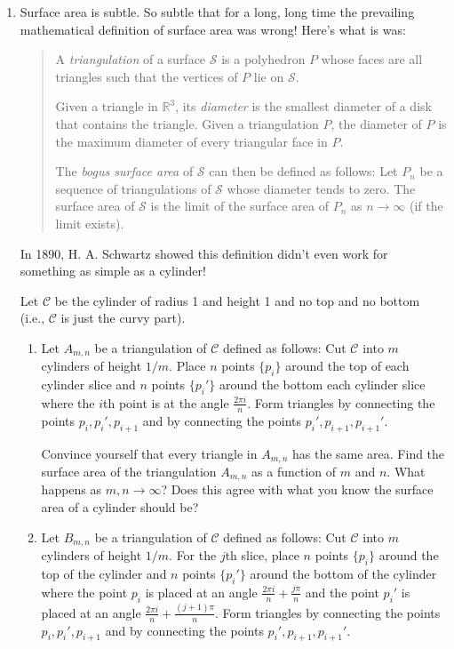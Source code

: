 \documentclass[letter]{article}
\newcommand{\R}{\mathbb{R}}
\begin{document}
\begin{enumerate}
		\item Surface area is subtle.  So subtle that for a long, long time the prevailing
			mathematical definition of surface area was wrong!  Here's what is was:
			\begin{quote}
				A \emph{triangulation} of a surface $\mathcal S$ is a polyhedron
				$P$ whose faces are all triangles such that the vertices of $P$ lie on
				$\mathcal S$.

				Given a triangle in $\R^3$, its \emph{diameter} is the smallest
				diameter of a disk that contains the triangle.  Given a triangulation
				$P$, the diameter of $P$ is the maximum diameter of every triangular face in $P$.

				The \emph{bogus surface area} of $\mathcal S$ can then be defined
				as follows:  Let $P_n$ be a sequence of triangulations of $\mathcal S$
				whose diameter tends to zero.  The surface area of $\mathcal S$
				is the limit of the surface area of $P_n$ as $n\to\infty$ (if the limit
				exists).
			\end{quote}

			In 1890, H. A. Schwartz showed this definition didn't even work for something as
			simple as a cylinder!

			Let $\mathcal C$ be the cylinder of radius 1 and height 1 and no top and no bottom 
			(i.e., $\mathcal C$ is just the curvy part).

			\begin{enumerate}
				\item Let $A_{m,n}$ be a triangulation of $\mathcal C$ defined as follows:
					Cut $\mathcal C$ into $m$ cylinders of height $1/m$.  Place
					$n$ points $\{p_i\}$ around the top of each cylinder slice
					and $n$ points $\{p_i'\}$ around the bottom each cylinder slice
					where the $i$th point is at the angle $\frac{2\pi i}{n}$.
					Form triangles by connecting the points $p_i, p_i', p_{i+1}$ and
					by connecting the points $p_i',p_{i+1},p_{i+1}'$.

					Convince yourself that every triangle in $A_{m,n}$
					has the same area.
					Find the surface area of the triangulation $A_{m,n}$ as a function
					of $m$ and $n$.  What happens as $m,n\to\infty$?  Does this agree with
					what you know the surface area of a cylinder should be?

				\item  Let $B_{m,n}$ be a triangulation of $\mathcal C$ defined as follows:
					Cut $\mathcal C$ into $m$ cylinders of height $1/m$.  For the $j$th slice,
					place
					$n$ points $\{p_i\}$ around the top of the cylinder 
					and $n$ points $\{p_i'\}$ around the bottom of the cylinder where
					the point $p_i$ is placed at an angle $\frac{2\pi i}{n} + \frac{j\pi}{n}$ and the
					point $p_i'$ is placed at an angle $\frac{2\pi i}{n}+ \frac{(j+1)\pi}{n}$.
					Form triangles by connecting the points $p_i, p_i', p_{i+1}$ and
					by connecting the points $p_i',p_{i+1},p_{i+1}'$.


\end{enumerate}
\end{enumerate}
\end{document}
